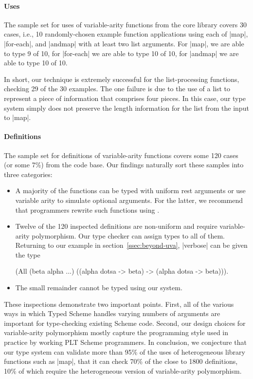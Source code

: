 \begin{schemeregion}
\paragraph{Uses} The sample set for uses of variable-arity functions from
 the core library covers 30 cases, i.e., 10 randomly-chosen example
 function applications using each of \scheme|map|, \scheme|for-each|, and
 \scheme|andmap| with at least two list arguments.  For \scheme|map|, we are
 able to type 9 of 10, for \scheme|for-each| we are able to type 10 of 10,
 for \scheme|andmap| we are able to type 10 of 10.

In short, our technique is extremely successful for the list-processing
 functions, checking 29 of the 30 examples.  The one failure is due to the
 use of a list to represent a piece of information that comprises four
 pieces. In this case, our type system simply does not preserve the
 length information for the list from the input to \scheme|map|.

\paragraph{Definitions} The sample set for definitions of variable-arity
 functions covers some 120 cases (or some 7\%) from the code base. Our
 findings naturally sort these samples into three categories:
\begin{itemize}
\item A majority of the functions can be typed with uniform rest
  arguments or use variable arity to simulate optional arguments. For
  the latter, we recommend that programmers rewrite such functions
  using .

\item Twelve of the 120 inspected definitions are non-uniform and require
  variable-arity polymorphism. Our type checker can assign types to
  all of them.  Returning to our example in section~\ref{ssec:beyond-uva},
  \scheme|verbose| can be given the type
\begin{schemedisplay}
  (All (beta alpha ...) ((alpha dotsa -> beta) -> (alpha dotsa -> beta))).
\end{schemedisplay}

\item The small remainder cannot be typed using our system.
\end{itemize}

These inspections demonstrate two important points. First,
 all of the various ways in which Typed Scheme handles varying numbers of
 arguments are important for type-checking existing Scheme
 code. Second, our design choices for variable-arity polymorphism mostly
 capture the programming style used in practice by working PLT Scheme
 programmers.
%
In conclusion, we conjecture that our type system can validate more
than 95\% of the uses of heterogeneous library functions such as \scheme|map|, that it can
check 70\% of the close to 1800 definitions, 10\% of which require the
heterogeneous version of variable-arity polymorphism.


\end{schemeregion}
